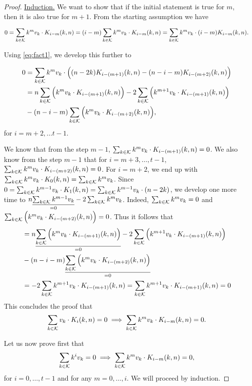 \begin{proof}
    \underline{Induction.} We want to show that if the initial statement is true for $m$, then it is also true for $m+1$. From the starting assumption we have

    $$
    0 = \sum_{k \in \mathcal{K}} k^mv_k \cdot K_{i-m}(k, n) = (i-m)\sum_{k \in \mathcal{K}} k^mv_k \cdot K_{i-m}(k, n) = \sum_{k \in \mathcal{K}} k^mv_k \cdot (i-m)K_{i-m}(k, n).
    $$

    Using \cref{eq:fact1}, we develop this further to

    \begin{equation*}
    \begin{split}
        0 &= \sum_{k \in \mathcal{K}} k^mv_k \cdot \Big( (n - 2k)K_{i - (m+1)}(k, n) - (n - i - m)K_{i - (m + 2)}(k, n) \Big)\\
        & = n \sum_{k \in \mathcal{K}} \Big( k^mv_k \cdot K_{i - (m+1)}(k, n) \Big) - 2\sum_{k \in \mathcal{K}} \Big( k^{m+1}v_k \cdot K_{i - (m+1)}(k, n) \Big)\\& - (n - i - m)\sum_{k \in \mathcal{K}} \Big( k^mv_k \cdot K_{i - (m+2)}(k, n) \Big),
    \end{split}
    \end{equation*}
    for $i = m+2, \ldots t-1$.

    We know that from the step $m-1$, $\sum_{k \in \mathcal{K}} k^mv_k \cdot K_{i - (m+1)}(k, n) = 0$. We also know from the step $m-1$ that for $i = m+3, \ldots, t-1$, $\sum_{k \in \mathcal{K}} k^mv_k \cdot K_{i - (m+2)}(k, n) = 0$. For $i = m + 2$, we end up with $\sum_{k \in \mathcal{K}} k^mv_k \cdot K_0(k, n) = \sum_{k \in \mathcal{K}} k^mv_k$. Since $0 = \sum_{k \in \mathcal{K}} k^{m-1}v_k \cdot K_1(k, n) = \sum_{k \in \mathcal{K}} k^{m-1}v_k \cdot (n - 2k)$, we develop one more time to $n\underset{=0}{\underline{\sum_{k \in \mathcal{K}} k^{m-1}v_k}} - 2\sum_{k \in \mathcal{K}} k^mv_k$. Indeed, $\sum_{k \in \mathcal{K}} k^mv_k = 0$ and $\sum_{k \in \mathcal{K}} \Big( k^mv_k \cdot K_{i - (m+2)}(k, n) \Big) = 0$. Thus it follows that
    \begin{equation*}
    \begin{split}
        & = n \underset{=0}{\underline{\sum_{k \in \mathcal{K}} \Big( k^mv_k \cdot K_{i - (m+1)}(k, n) \Big)}} - 2\sum_{k \in \mathcal{K}} \Big( k^{m+1}v_k \cdot K_{i - (m+1)}(k, n) \Big)\\& - (n - i - m)\underset{=0}{\underline{\sum_{k \in \mathcal{K}} \Big( k^mv_k \cdot K_{i - (m+2)}(k, n) \Big)}}\\
        &= -2\sum_{k \in \mathcal{K}} k^{m+1}v_k \cdot K_{i - (m+1)}(k, n) = \sum_{k \in \mathcal{K}} k^{m+1}v_k \cdot K_{i - (m+1)}(k, n) = 0
    \end{split}
    \end{equation*}
    This concludes the proof that
    $$\sum_{k \in \mathcal{K}} v_k \cdot K_i(k, n) = 0 \implies \sum_{k \in \mathcal{K}} k^mv_k \cdot K_{i-m}(k, n) = 0.$$

        Let us now prove first that
    $$\sum_{k \in \mathcal{K}} k^iv_k = 0 \implies \sum_{k \in \mathcal{K}} k^mv_k \cdot K_{i-m}(k, n) = 0,$$ for $i = 0, \ldots, t-1$ and for any $m = 0, \ldots, i$. We will proceed by induction.


\end{proof}
